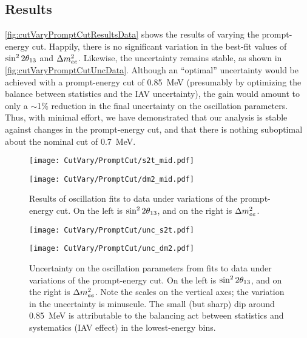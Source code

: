 \documentclass[../thesis.tex]{subfiles}
\begin{document}
\subsection{Results}
\label{sec:cutVaryPromptCutResults}


\autoref{fig:cutVaryPromptCutResultsData} shows the results of varying the prompt-energy cut. Happily, there is no significant variation in the best-fit values of $\sin^2 2\theta_{13}$ and $\Delta m^2_{ee}$. Likewise, the uncertainty remains stable, as shown in \autoref{fig:cutVaryPromptCutUncData}. Although an ``optimal'' uncertainty would be achieved with a prompt-energy cut of 0.85~MeV (presumably by optimizing the balance between statistics and the IAV uncertainty), the gain would amount to only a $\sim$1\% reduction in the final uncertainty on the oscillation parameters. Thus, with minimal effort, we have demonstrated that our analysis is stable against changes in the prompt-energy cut, and that there is nothing suboptimal about the nominal cut of 0.7~MeV.

\begin{figure}[ht]
  \begin{minipage}{0.47\linewidth}%
    \texttt{[image: CutVary/PromptCut/s2t\_mid.pdf]}%
  \end{minipage}%
  \begin{minipage}{0.47\linewidth}%
    \texttt{[image: CutVary/PromptCut/dm2\_mid.pdf]}%
  \end{minipage}%
  \caption{Results of oscillation fits to data under variations of the prompt-energy cut. On the left is $\sin^2 2\theta_{13}$, and on the right is $\Delta m^2_{ee}$.}
  \label{fig:cutVaryPromptCutResultsData}
\end{figure}

\begin{figure}[ht]
  \begin{minipage}{0.47\linewidth}%
    \texttt{[image: CutVary/PromptCut/unc\_s2t.pdf]}%
  \end{minipage}%
  \begin{minipage}{0.47\linewidth}%
    \texttt{[image: CutVary/PromptCut/unc\_dm2.pdf]}%
  \end{minipage}%
  \caption{Uncertainty on the oscillation parameters from fits to data under variations of the prompt-energy cut. On the left is $\sin^2 2\theta_{13}$, and on the right is $\Delta m^2_{ee}$. Note the scales on the vertical axes; the variation in the uncertainty is minuscule. The small (but sharp) dip around 0.85~MeV is attributable to the balancing act between statistics and systematics (IAV effect) in the lowest-energy bins.}
  \label{fig:cutVaryPromptCutUncData}
\end{figure}
\end{document}
